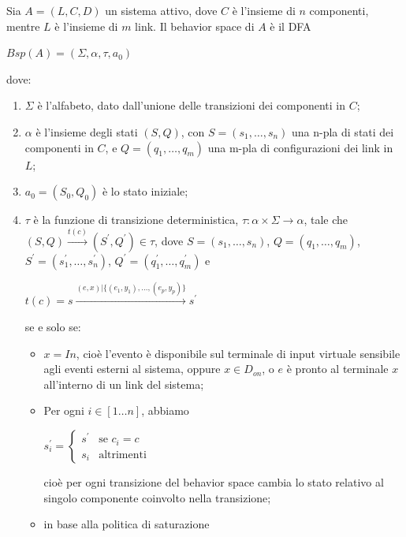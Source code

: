 \begin{defn}
Sia $A = (L,C,D)$ un sistema attivo, dove $C$ è l'insieme di $n$ componenti, mentre $L$ è l'insieme di $m$ link. Il behavior space di $A$ è il DFA
\begin{center}
	$Bsp(A) = (\Sigma,\alpha,\tau,a_0)$
\end{center}
dove:
\begin{enumerate}
\item $\Sigma$ è l'alfabeto, dato dall'unione delle transizioni dei componenti in $C$;
\item $\alpha$  è l'insieme degli stati $(S,Q)$, con $S = (s_1,\ldots,s_n)$ una n-pla di stati dei componenti in $C$, e $Q = (q_1, \ldots,q_m)$ una m-pla di configurazioni dei link in $L$;
\item $a_0 = (S_0,Q_0)$ è lo stato iniziale;
\item $\tau$ è la funzione di transizione deterministica, $\tau: \alpha \times \Sigma \rightarrow \alpha$, tale che $(S,Q) \xrightarrow{t(c)} (S^\prime, Q^\prime) \in \tau$, dove $S = (s_1, \ldots,s_n)$, $Q = (q_1, \ldots,q_m)$, $S^\prime = (s^\prime_1, \ldots,s^\prime_n)$, $Q^\prime = (q^\prime_1, \ldots,q^\prime_m)$ e
\begin{center}
$t(c) = s \xrightarrow{(e,x) | \{(e_1,y_1), \ldots, (e_p,y_p)\}} s^\prime$
\end{center}
se e solo se:
\begin{itemize}
\item $x = In$, cioè l'evento è disponibile sul terminale di input virtuale sensibile agli eventi esterni al sistema, oppure $x \in D_{on}$, o $e$ è pronto al terminale $x$ all'interno di un link del sistema;
\item Per ogni $i \in [1 \ldots n]$, abbiamo
\begin{center}
$s^\prime_i = \begin{cases} s^\prime & \mbox{se }c_i = c\\ s_i & \mbox{altrimenti} \end{cases}$
\end{center}
cioè per ogni transizione del behavior space cambia lo stato relativo al singolo componente coinvolto nella transizione;
\item in base alla politica di saturazione
\end{itemize}
\end{enumerate}
\end{defn}

\newpage
